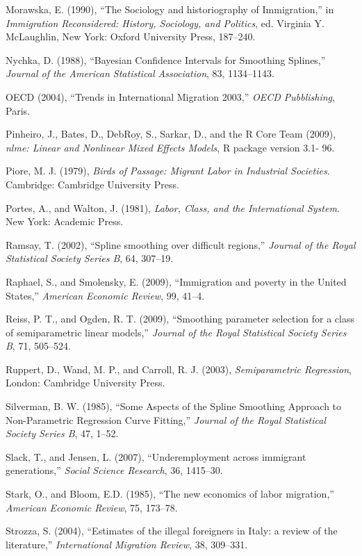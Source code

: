 \documentclass[10pt] {article}
\theoremstyle{definition}
\theoremstyle{plain}
\begin{document}
\begin{thebibliography}{99}
\bibitem{} Morawska, E. (1990), ``The Sociology and historiography of Immigration,'' in \textit{Immigration Reconsidered: History, Sociology, and Politics}, ed. Virginia Y. McLaughlin, New York: Oxford University Press, 187--240.

\bibitem{} Nychka, D. (1988), ``Bayesian Confidence Intervals for Smoothing Splines,'' \textit{Journal of the American Statistical Association}, 83, 1134--1143.

\bibitem{} OECD (2004), ``Trends in International Migration 2003,'' \textit{OECD Pubblishing}, Paris.

\bibitem{} Pinheiro, J., Bates, D., DebRoy, S., Sarkar, D., and the R Core Team (2009), \textit{nlme: Linear and Nonlinear Mixed Effects Models}, R package version 3.1- 96.

\bibitem{} Piore, M. J. (1979), \textit{Birds of Passage: Migrant Labor in Industrial Societies}. Cambridge: Cambridge University Press.

\bibitem{} Portes, A., and Walton, J. (1981), \textit{Labor, Class, and the International System}. New York: Academic Press.

\bibitem{} Ramsay, T. (2002), ``Spline smoothing over difficult regions,'' \textit{Journal of the Royal Statistical Society Series B}, 64, 307--19.

\bibitem{} Raphael, S., and Smolensky, E. (2009), ``Immigration and poverty in the United States,'' \textit{American Economic Review}, 99, 41--4.

\bibitem{} Reiss, P. T., and Ogden, R. T. (2009), ``Smoothing parameter selection for a class of semiparametric linear models,'' \textit{Journal of the Royal Statistical Society Series B}, 71, 505--524.

\bibitem{} Ruppert, D., Wand, M. P., and Carroll, R. J. (2003), \textit{Semiparametric Regression}, London: Cambridge University Press.

\bibitem{} Silverman, B. W. (1985), ``Some Aspects of the Spline Smoothing Approach to Non-Parametric Regression Curve Fitting,'' \textit{Journal of the Royal Statistical Society Series B}, 47, 1--52.

\bibitem{} Slack, T., and Jensen, L. (2007), ``Underemployment across immigrant generations,'' \textit{Social Science Research}, 36, 1415--30.

\bibitem{} Stark, O., and Bloom, E.D. (1985), ``The new economics of labor migration,'' \textit{American Economic Review}, 75, 173--78.

\bibitem{} Strozza, S. (2004), ``Estimates of the illegal foreigners in Italy: a review of the literature,'' \textit{International Migration Review}, 38, 309--331.


\end{thebibliography}
\end{document}
